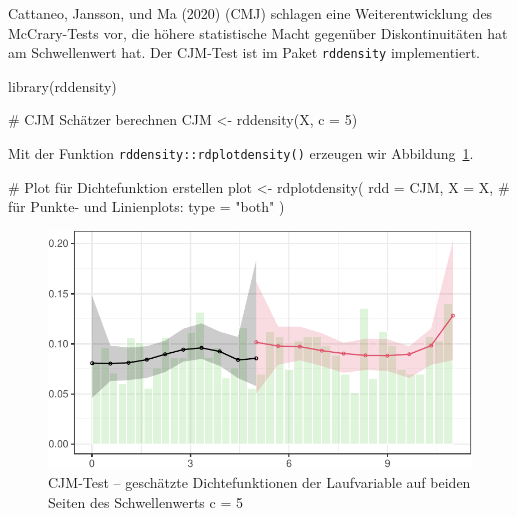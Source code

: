 \documentclass[
  a4paper,
  DIV=11,
  oneside]{scrreprt}
\newenvironment{Shaded}{\begin{snugshade}}{\end{snugshade}}
\newcommand{\AttributeTok}[1]{\textcolor[rgb]{0.40,0.45,0.13}{#1}}
\newcommand{\CommentTok}[1]{\textcolor[rgb]{0.37,0.37,0.37}{#1}}
\newcommand{\DecValTok}[1]{\textcolor[rgb]{0.68,0.00,0.00}{#1}}
\newcommand{\FunctionTok}[1]{\textcolor[rgb]{0.28,0.35,0.67}{#1}}
\newcommand{\NormalTok}[1]{\textcolor[rgb]{0.00,0.23,0.31}{#1}}
\newcommand{\OtherTok}[1]{\textcolor[rgb]{0.00,0.23,0.31}{#1}}
\newcommand{\StringTok}[1]{\textcolor[rgb]{0.13,0.47,0.30}{#1}}
\begin{document}
Cattaneo, Jansson, und Ma (2020) (CMJ) schlagen eine Weiterentwicklung
des McCrary-Tests vor, die höhere statistische Macht gegenüber
Diskontinuitäten hat am Schwellenwert hat. Der CJM-Test ist im Paket
\texttt{rddensity} implementiert.

\begin{Shaded}
\begin{Highlighting}[]
\FunctionTok{library}\NormalTok{(rddensity)}

\CommentTok{\# CJM Schätzer berechnen}
\NormalTok{CJM }\OtherTok{\textless{}{-}} \FunctionTok{rddensity}\NormalTok{(X, }\AttributeTok{c =} \DecValTok{5}\NormalTok{)}
\end{Highlighting}
\end{Shaded}

Mit der Funktion \texttt{rddensity::rdplotdensity()} erzeugen wir
Abbildung~\ref{fig-cjmtsim}.

\begin{Shaded}
\begin{Highlighting}[]
\CommentTok{\# Plot für Dichtefunktion erstellen}
\NormalTok{plot }\OtherTok{\textless{}{-}} \FunctionTok{rdplotdensity}\NormalTok{(}
  \AttributeTok{rdd =}\NormalTok{ CJM, }
  \AttributeTok{X =}\NormalTok{ X, }
  \CommentTok{\# für Punkte{-} und Linienplots:}
  \AttributeTok{type =} \StringTok{"both"} 
\NormalTok{)}
\end{Highlighting}
\end{Shaded}

\begin{figure}[t]

{\centering \includegraphics{RDD_files/figure-pdf/fig-cjmtsim-1.pdf}

}

\caption{\label{fig-cjmtsim}CJM-Test -- geschätzte Dichtefunktionen der
Laufvariable auf beiden Seiten des Schwellenwerts c = 5}

\end{figure}
\end{document}
